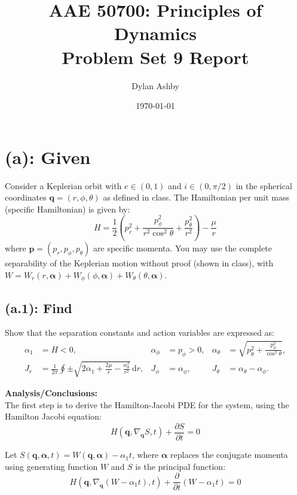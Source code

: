 \documentclass[titlepage]{article}
\title{AAE 50700: Principles of Dynamics\\ Problem Set 9 Report}
\author{Dylan Ashby}
\date{\today}
\begin{document}
\maketitle

\section*{(a): Given}

Consider a Keplerian orbit with $e\in(0,1)$ and $i\in(0,\pi/2)$ in the spherical coordinates $\boldsymbol{q}=(r,\phi,\theta)$ as defined in class. The Hamiltonian per unit mass (specific Hamiltonian) is given by:
\begin{equation}
	H=\frac{1}{2}\left(p_r^2+\frac{p_\phi^2}{r^2\cos^2\theta}+\frac{p_\theta^2}{r^2}\right)-\frac{\mu}{r}
\end{equation}
where $\boldsymbol{p}=(p_r,p_\phi,p_\theta)$ are specific momenta. You may use the complete separability of the Keplerian motion without proof (shown in class), with $W=W_r(r,\boldsymbol{\alpha})+W_\phi(\phi,\boldsymbol{\alpha})+W_\theta(\theta,\boldsymbol{\alpha})$.

\subsection*{(a.1): Find}

Show that the separation constants and action variables are expressed as:
\begin{equation}
	\begin{aligned}
		\alpha_1 &= H < 0, & \alpha_\phi &= p_\phi > 0, & \alpha_\theta &= \sqrt{p_\theta^2 + \frac{p_\phi^2}{\cos^2\theta}}, \\
		J_r &= \frac{1}{2\pi} \oint \pm \sqrt{2\alpha_1 + \frac{2\mu}{r} - \frac{\alpha_\theta^2}{r^2}}\,\mathrm{d}r, & J_\phi &= \alpha_\phi, & J_\theta &= \alpha_\theta - \alpha_\phi.
	\end{aligned}
\end{equation}

\textbf{Analysis/Conclusions:}\\

The first step is to derive the Hamilton-Jacobi PDE for the system, using the Hamilton Jacobi equation:
\begin{equation}
	H\left(\boldsymbol{q},\nabla_{\boldsymbol{q}}S,t\right)+\frac{\partial S}{\partial t}=0
\end{equation}

Let $S(\boldsymbol{q},\boldsymbol{\alpha},t)=W(\boldsymbol{q},\boldsymbol{\alpha})-\alpha_1 t$, where $\boldsymbol{\alpha}$ replaces the conjugate momenta using generating function $W$ and $S$ is the principal function:
\begin{equation}
	H\left(\boldsymbol{q},\nabla_{\boldsymbol{q}}\left(W-\alpha_1 t\right),t\right)+\frac{\partial}{\partial t}\left(W-\alpha_1 t\right)=0
\end{equation}
\end{document}
